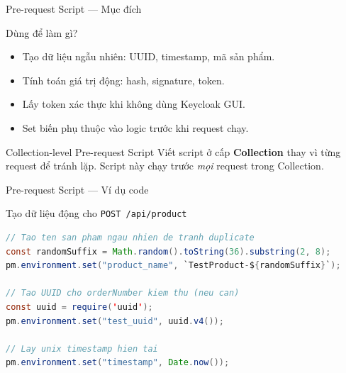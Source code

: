 \documentclass[aspectratio=169,10pt]{beamer}
\begin{document}
\begin{frame}{Pre-request Script --- Mục đích}
  \begin{block}{Dùng để làm gì?}
    \begin{itemize}
      \item Tạo dữ liệu ngẫu nhiên: UUID, timestamp, mã sản phẩm.
      \item Tính toán giá trị động: hash, signature, token.
      \item Lấy token xác thực khi không dùng Keycloak GUI.
      \item Set biến phụ thuộc vào logic trước khi request chạy.
    \end{itemize}
  \end{block}

  \begin{exampleblock}{Collection-level Pre-request Script}
    Viết script ở cấp \textbf{Collection} thay vì từng request để tránh lặp.
    Script này chạy trước \textit{mọi} request trong Collection.
  \end{exampleblock}
\end{frame}

\begin{frame}[fragile]{Pre-request Script --- Ví dụ code}
  \begin{block}{Tạo dữ liệu động cho \texttt{POST /api/product}}
\begin{lstlisting}[language=Java,style=nonumber]
// Tao ten san pham ngau nhien de tranh duplicate
const randomSuffix = Math.random().toString(36).substring(2, 8);
pm.environment.set("product_name", `TestProduct-${randomSuffix}`);

// Tao UUID cho orderNumber kiem thu (neu can)
const uuid = require('uuid');
pm.environment.set("test_uuid", uuid.v4());

// Lay unix timestamp hien tai
pm.environment.set("timestamp", Date.now());
\end{lstlisting}
  \end{block}
\end{frame}
\end{document}
